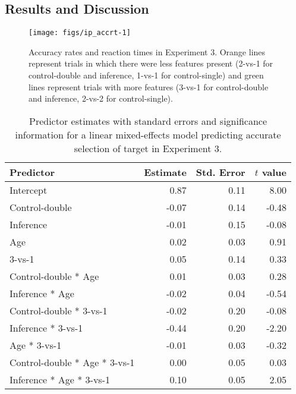\documentclass[a4paper,man,apacite,floatsintext]{apa6}
\newenvironment{CodeChunk}{}{}
\begin{document}
\subsection{Results and Discussion}\label{results-and-discussion-2}

\begin{CodeChunk}
\begin{figure}[H]

{\centering \texttt{[image: figs/ip\_accrt-1]} 

}

\caption[Accuracy rates and reaction times in Experiment 3]{Accuracy rates and reaction times in Experiment 3. Orange lines represent trials in which there were less features present (2-vs-1 for control-double and inference, 1-vs-1 for control-single) and green lines represent trials with more features (3-vs-1 for control-double and inference, 2-vs-2 for control-single).}\label{fig:ip_accrt}
\end{figure}
\end{CodeChunk}

\begin{table}[tb]
\centering
\begin{tabular}{lrrr}
 Predictor & Estimate & Std. Error & $t$ value \\ 
  \hline
Intercept & 0.87 & 0.11 & 8.00 \\ 
  Control-double & -0.07 & 0.14 & -0.48 \\ 
  Inference & -0.01 & 0.15 & -0.08 \\ 
  Age & 0.02 & 0.03 & 0.91 \\ 
  3-vs-1 & 0.05 & 0.14 & 0.33 \\ 
  Control-double * Age & 0.01 & 0.03 & 0.28 \\ 
  Inference * Age & -0.02 & 0.04 & -0.54 \\ 
  Control-double * 3-vs-1 & -0.02 & 0.20 & -0.08 \\ 
  Inference * 3-vs-1 & -0.44 & 0.20 & -2.20 \\ 
  Age * 3-vs-1 & -0.01 & 0.03 & -0.32 \\ 
  Control-double * Age * 3-vs-1 & 0.00 & 0.05 & 0.03 \\ 
  Inference * Age * 3-vs-1 & 0.10 & 0.05 & 2.05 \\ 
   \hline
\end{tabular}
\caption{Predictor estimates with standard errors and significance information for a linear mixed-effects model predicting accurate selection of target in Experiment 3.} 
\label{tab:exp3_tab}
\end{table}
\end{document}
